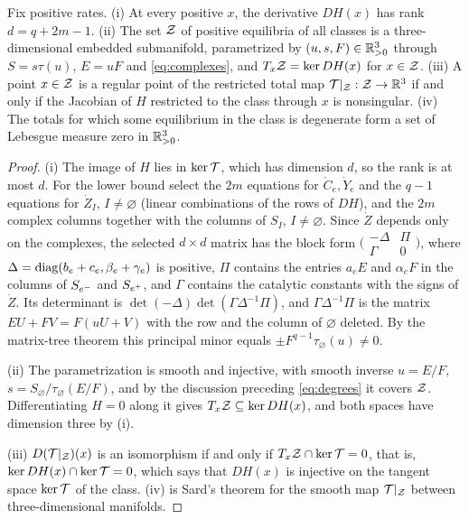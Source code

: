 \begin{lemma}\label{lem:regular}
Fix positive rates. \textup{(i)} At every positive \(x\), the derivative \(DH(x)\) has rank
\(d=q+2m-1\). \textup{(ii)} The set \(\mathcal Z\) of positive equilibria of all classes is a
three-dimensional embedded submanifold, parametrized by
\((u,s,F)\in\mathbb R^3_{>0}\) through \(S=s\tau(u)\), \(E=uF\) and \eqref{eq:complexes}, and
\(T_x\mathcal Z=\ker DH(x)\) for \(x\in\mathcal Z\). \textup{(iii)} A point \(x\in\mathcal Z\) is a regular point of
the restricted total map \(\mathcal T|_\mathcal Z:\mathcal Z\to\mathbb R^3\) if and only if the Jacobian of \(H\) restricted
to the class through \(x\) is nonsingular. \textup{(iv)} The totals for which some equilibrium
in the class is degenerate form a set of Lebesgue measure zero in \(\mathbb R^3_{>0}\).
\end{lemma}
\begin{proof}
(i) The image of \(H\) lies in \(\ker\mathcal T\), which has dimension \(d\), so the rank is at most
\(d\). For the lower bound select the \(2m\) equations for \(\dot C_e,\dot Y_e\) and the
\(q-1\) equations for \(\dot Z_I\), \(I\ne\varnothing\) (linear combinations of the rows of
\(DH\)), and the \(2m\) complex columns together with the columns of \(S_I\),
\(I\ne\varnothing\). Since \(\dot Z\) depends only on the complexes, the selected
\(d\times d\) matrix has the block form
\(\bigl(\begin{smallmatrix}-\Delta&\Pi\\ \Gamma&0\end{smallmatrix}\bigr)\), where
\(\Delta=\operatorname{diag}(b_e+c_e,\beta_e+\gamma_e)\) is positive, \(\Pi\) contains the entries
\(a_eE\) and \(\alpha_eF\) in the columns of \(S_{e^{-}}\) and \(S_{e^{+}}\), and \(\Gamma\)
contains the catalytic constants with the signs of \(\dot Z\). Its determinant is
\(\det(-\Delta)\det(\Gamma\Delta^{-1}\Pi)\), and \(\Gamma\Delta^{-1}\Pi\) is the matrix
\(EU+FV=F(uU+V)\) with the row and the column of \(\varnothing\) deleted. By the matrix-tree
theorem this principal minor equals \(\pm F^{q-1}\tau_\varnothing(u)\ne0\).

(ii) The parametrization is smooth and injective, with smooth inverse
\(u=E/F\), \(s=S_\varnothing/\tau_\varnothing(E/F)\), and by the discussion preceding
\eqref{eq:degrees} it covers \(\mathcal Z\). Differentiating \(H=0\) along it gives
\(T_x\mathcal Z\subseteq\ker DH(x)\), and both spaces have dimension three by (i).

(iii) \(D(\mathcal T|_\mathcal Z)(x)\) is an isomorphism if and only if \(T_x\mathcal Z\cap\ker\mathcal T=0\), that is,
\(\ker DH(x)\cap\ker\mathcal T=0\), which says that \(DH(x)\) is injective on the tangent space
\(\ker\mathcal T\) of the class. (iv) is Sard's theorem \cite{Milnor1965} for the smooth map
\(\mathcal T|_\mathcal Z\) between three-dimensional manifolds.
\end{proof}

